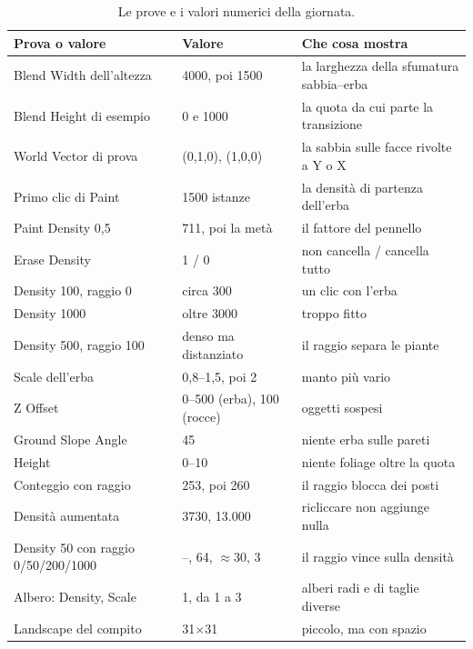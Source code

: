 \begin{table}[htbp]
\centering
\small
\begin{tabular}{@{}p{5.2cm}p{3.0cm}p{5.8cm}@{}}
\toprule
\textbf{Prova o valore} & \textbf{Valore} & \textbf{Che cosa mostra} \\
\midrule
Blend Width dell'altezza & 4000, poi 1500 & la larghezza della sfumatura sabbia--erba \\
Blend Height di esempio & 0 e 1000 & la quota da cui parte la transizione \\
World Vector di prova & (0,1,0), (1,0,0) & la sabbia sulle facce rivolte a Y o X \\
Primo clic di Paint & 1500 istanze & la densità di partenza dell'erba \\
Paint Density 0,5 & 711, poi la metà & il fattore del pennello \\
Erase Density & 1 / 0 & non cancella / cancella tutto \\
Density 100, raggio 0 & circa 300 & un clic con l'erba \\
Density 1000 & oltre 3000 & troppo fitto \\
Density 500, raggio 100 & denso ma distanziato & il raggio separa le piante \\
Scale dell'erba & 0,8--1,5, poi 2 & manto più vario \\
Z Offset & 0--500 (erba), 100 (rocce) & oggetti sospesi \\
Ground Slope Angle & 45 & niente erba sulle pareti \\
Height & 0--10 & niente foliage oltre la quota \\
Conteggio con raggio & 253, poi 260 & il raggio blocca dei posti \\
Densità aumentata & 3730, 13.000 & ricliccare non aggiunge nulla \\
Density 50 con raggio 0/50/200/1000 & --, 64, $\approx$30, 3 & il raggio vince sulla densità \\
Albero: Density, Scale & 1, da 1 a 3 & alberi radi e di taglie diverse \\
Landscape del compito & 31$\times$31 & piccolo, ma con spazio \\
\bottomrule
\end{tabular}
\caption{Le prove e i valori numerici della giornata.}
\label{ue15:tab:misure}
\end{table}

